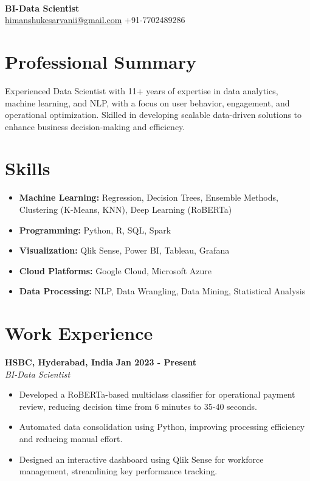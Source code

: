 \documentclass[a4paper,10pt]{article}
\begin{document}
\pagestyle{empty}
\begin{center}
    {\LARGE {}}\\
    \textbf{BI-Data Scientist}\\
    \href{mailto:himanshukesarvanii@gmail.com}{himanshukesarvanii@gmail.com} \hfill +91-7702489286 \\
\end{center}

\section*{Professional Summary}
Experienced Data Scientist with 11+ years of expertise in data analytics, machine learning, and NLP, with a focus on user behavior, engagement, and operational optimization. Skilled in developing scalable data-driven solutions to enhance business decision-making and efficiency.

\section*{Skills}
\begin{itemize}
    \item \textbf{Machine Learning:} Regression, Decision Trees, Ensemble Methods, Clustering (K-Means, KNN), Deep Learning (RoBERTa)
    \item \textbf{Programming:} Python, R, SQL, Spark
    \item \textbf{Visualization:} Qlik Sense, Power BI, Tableau, Grafana
    \item \textbf{Cloud Platforms:} Google Cloud, Microsoft Azure
    \item \textbf{Data Processing:} NLP, Data Wrangling, Data Mining, Statistical Analysis
\end{itemize}

\section*{Work Experience}
\textbf{HSBC, Hyderabad, India} \hfill \textbf{Jan 2023 - Present}\\
\textit{BI-Data Scientist}
\begin{itemize}
    \item Developed a RoBERTa-based multiclass classifier for operational payment review, reducing decision time from 6 minutes to 35-40 seconds.
    \item Automated data consolidation using Python, improving processing efficiency and reducing manual effort.
    \item Designed an interactive dashboard using Qlik Sense for workforce management, streamlining key performance tracking.
\end{itemize}
\end{document}

